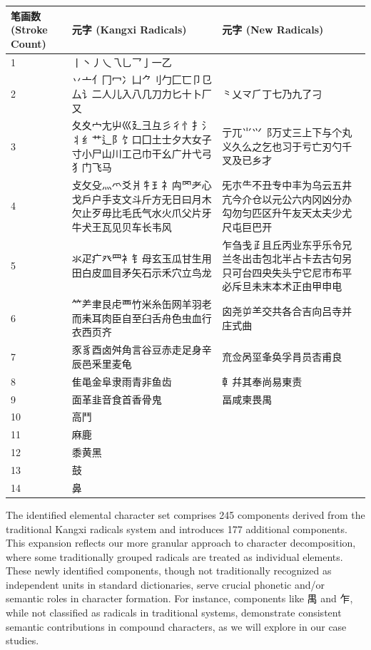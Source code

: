 \documentclass[11pt,letterpaper]{article}
\begin{document}
\begin{longtable}{|p{1.5cm}|p{6.5cm}|p{6.5cm}|}
\hline
\textbf{笔画数 (Stroke Count)} & \textbf{元字 (Kangxi Radicals)} & \textbf{元字 (New Radicals)} \\
\hline
1 & 丨丶丿乀乁乚乛亅一乙 & \\
\hline
2 & 丷亠亻冂冖冫凵⺈刂勹匚匸卩㔾厶讠二人儿入八几刀力匕十卜厂又 &
⺀乂龴⺁丁七乃九了刁 \\
\hline
3 &
夂夊宀尢屮巛廴彐彑彡彳忄扌氵丬纟艹辶阝饣口囗土士夕大女子寸小尸山川工己巾干幺广廾弋弓犭门飞马
& 亍兀⺌⺍⻏万丈三上下与个丸义久么之乞也习于亏亡刃勺千叉及已乡才 \\
\hline
4 &
攴攵殳灬爫爻爿牜⺩礻禸罓耂心戈戶户手支文斗斤方无日曰月木欠止歹毋比毛氏气水火爪父片牙牛犬王瓦见贝车长韦风
&
旡朩⺧不丑专中丰为乌云五井亢今介仓以元公六内冈凶分办勾勿匀匹区升午友天太夫少尤尺屯巨巴开 \\
\hline
5 & 氺疋疒癶罒衤钅母玄玉瓜甘生用田白皮皿目矛矢石示禾穴立鸟龙 &
乍刍戋𤴔且丘丙业东乎乐令兄兰冬出击包北半占卡去古句另只可台四央失头宁它尼市布平必斥旦未末本术正由甲申电 \\
\hline
6 & ⺮⺶聿艮虍覀竹米糸缶网羊羽老而耒耳肉臣自至臼舌舟色虫血行衣西页齐 &
囟尧屰⺷交共各合吉向吕寺并庄式曲 \\
\hline
7 & 豕豸酉卤舛角言谷豆赤走足身辛辰邑釆里麦龟 &
㐬佥呙坙夆奂孚肙员㕻甫良 \\
\hline
8 & 隹黾金阜隶雨青非鱼齿 & 龺幷其奉尚易東责 \\
\hline
9 & 面革韭音食首香骨鬼 & 畐咸柬畏禺 \\
\hline
10 & 高鬥 & \\
\hline
11 & 麻鹿 & \\
\hline
12 & 黍黄黑 & \\
\hline
13 & 鼓 & \\
\hline
14 & 鼻 & \\
\hline
\end{longtable}

The identified elemental character set comprises 245 components derived
from the traditional Kangxi radicals system and introduces 177
additional components. This expansion reflects our more granular
approach to character decomposition, where some traditionally grouped
radicals are treated as individual elements. These newly identified
components, though not traditionally recognized as independent units in
standard dictionaries, serve crucial phonetic and/or semantic roles in
character formation. For instance, components like 禺 and 乍, while not
classified as radicals in traditional systems, demonstrate consistent
semantic contributions in compound characters, as we will explore in our
case studies.
\end{document}
